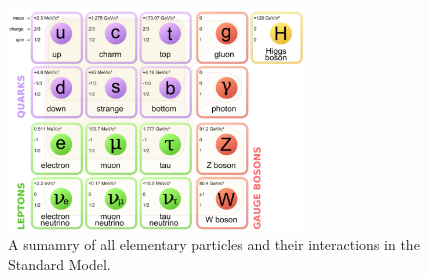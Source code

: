 \begin{figure}[hbtp]
 \begin{center}
   \includegraphics[width=0.7\textwidth]{sm_particles_periodic_table.pdf}
   \caption[text in square brackets]{A sumamry of all elementary particles and their interactions in the Standard Model.}
   \label{fig:sm_periodic_table}
 \end{center}
\end{figure}


